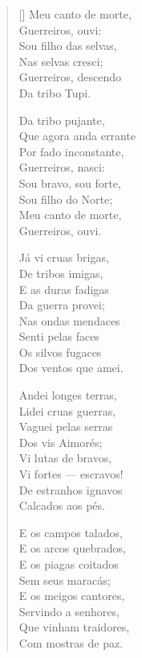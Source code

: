 \documentclass[12pt]{book}
\begin{document}
					\begin{verse}[\versewidth]
						Meu canto de morte, \\
						Guerreiros, ouvi: \\
						Sou filho das selvas, \\
						Nas selvas cresci; \\
						Guerreiros, descendo \\
						Da tribo Tupi.
						
						Da tribo pujante, \\
						Que agora anda errante \\
						Por fado inconstante, \\
						Guerreiros, nasci: \\
						Sou bravo, sou forte, \\
						Sou filho do Norte; \\
						Meu canto de morte, \\
						Guerreiros, ouvi.
						
						Já vi cruas brigas, \\
						De tribos imigas, \\
						E as duras fadigas \\
						Da guerra provei; \\
						Nas ondas mendaces \\
						Senti pelas faces \\
						Os silvos fugaces \\
						Dos ventos que amei.
						
						Andei longes terras, \\
						Lidei cruas guerras, \\
						Vaguei pelas serras \\
						Dos vis Aimorés; \\
						Vi lutas de bravos, \\
						Vi fortes — escravos! \\
						De estranhos ignavos \\
						Calcados aos pés.
						
						E os campos talados, \\
						E os arcos quebrados, \\
						E os piagas coitados \\
						Sem seus maracás; \\
						E os meigos cantores, \\
						Servindo a senhores, \\
						Que vinham traidores, \\
						Com mostras de paz.
						

\end{verse}
\end{document}
